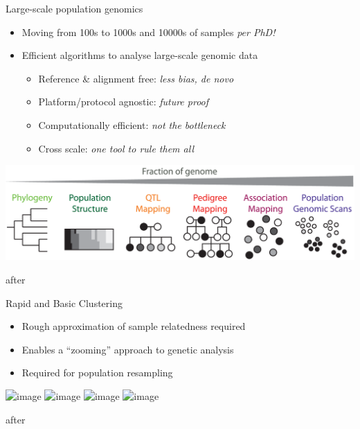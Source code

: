 \documentclass[t]{beamer}
\begin{document}
\begin{frame}{Large-scale population genomics}
  \begin{itemize}
    \item Moving from 100s to 1000s and 10000s of samples \textit{per PhD!}
      \pause
    \item Efficient algorithms to analyse large-scale genomic data
    \begin{itemize}
      \item Reference \& alignment free: \textit{less bias, de novo}
      \item Platform/protocol agnostic: \textit{future proof}
      \item Computationally efficient: \textit{not the bottleneck}
      \item Cross scale: \textit{one tool to rule them all}
    \end{itemize}
  \end{itemize}
  \begin{center}
    \includegraphics[width=\textwidth]{img/cross-scale.png}
  \end{center}
  \tiny{after \textcite{peterson_double_2012}}
\end{frame}


\begin{frame}{Rapid and Basic Clustering}
  \begin{itemize}
    \item Rough approximation of sample relatedness required
    \item Enables a ``zooming'' approach to genetic analysis
    \item Required for population resampling
  \end{itemize}
  \pause
  \begin{center}
    \includegraphics<1>[width=\textwidth]{img/restruct-1}
    \includegraphics<2>[width=\textwidth]{img/restruct-2}
    \includegraphics<3>[width=\textwidth]{img/restruct-3}
    \includegraphics<4>[width=\textwidth]{img/restruct-4}
  \end{center}
  \tiny{after \textcite{brachi_genome-wide_2011}}
\end{frame}
\end{document}
